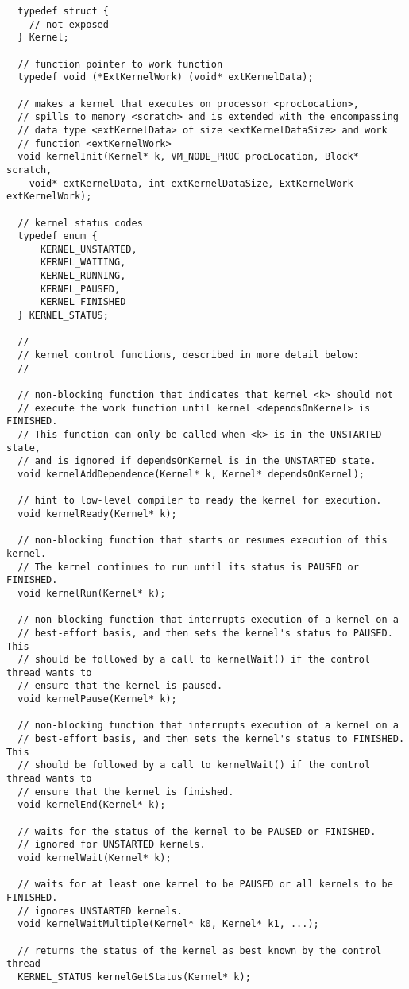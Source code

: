 {\small
\begin{verbatim}
  typedef struct {
    // not exposed
  } Kernel;

  // function pointer to work function
  typedef void (*ExtKernelWork) (void* extKernelData);

  // makes a kernel that executes on processor <procLocation>,
  // spills to memory <scratch> and is extended with the encompassing
  // data type <extKernelData> of size <extKernelDataSize> and work
  // function <extKernelWork>
  void kernelInit(Kernel* k, VM_NODE_PROC procLocation, Block* scratch,
    void* extKernelData, int extKernelDataSize, ExtKernelWork extKernelWork);

  // kernel status codes
  typedef enum {
      KERNEL_UNSTARTED,
      KERNEL_WAITING,
      KERNEL_RUNNING,
      KERNEL_PAUSED,
      KERNEL_FINISHED
  } KERNEL_STATUS;

  //
  // kernel control functions, described in more detail below:
  //

  // non-blocking function that indicates that kernel <k> should not 
  // execute the work function until kernel <dependsOnKernel> is FINISHED.  
  // This function can only be called when <k> is in the UNSTARTED state,
  // and is ignored if dependsOnKernel is in the UNSTARTED state.
  void kernelAddDependence(Kernel* k, Kernel* dependsOnKernel);

  // hint to low-level compiler to ready the kernel for execution.
  void kernelReady(Kernel* k);

  // non-blocking function that starts or resumes execution of this kernel. 
  // The kernel continues to run until its status is PAUSED or FINISHED.
  void kernelRun(Kernel* k);

  // non-blocking function that interrupts execution of a kernel on a
  // best-effort basis, and then sets the kernel's status to PAUSED.  This 
  // should be followed by a call to kernelWait() if the control thread wants to
  // ensure that the kernel is paused.
  void kernelPause(Kernel* k);

  // non-blocking function that interrupts execution of a kernel on a 
  // best-effort basis, and then sets the kernel's status to FINISHED.  This 
  // should be followed by a call to kernelWait() if the control thread wants to
  // ensure that the kernel is finished.
  void kernelEnd(Kernel* k);

  // waits for the status of the kernel to be PAUSED or FINISHED.
  // ignored for UNSTARTED kernels.
  void kernelWait(Kernel* k);

  // waits for at least one kernel to be PAUSED or all kernels to be FINISHED.
  // ignores UNSTARTED kernels.
  void kernelWaitMultiple(Kernel* k0, Kernel* k1, ...);

  // returns the status of the kernel as best known by the control thread
  KERNEL_STATUS kernelGetStatus(Kernel* k);
\end{verbatim}}

